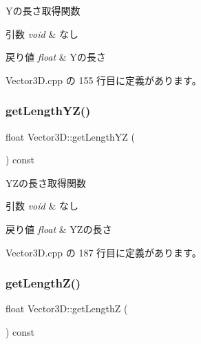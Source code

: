 Yの長さ取得関数 


\begin{DoxyParams}{引数}
{\em void} & なし \\
\hline
\end{DoxyParams}

\begin{DoxyRetVals}{戻り値}
{\em float} & Yの長さ \\
\hline
\end{DoxyRetVals}


 Vector3\+D.\+cpp の 155 行目に定義があります。

\mbox{\label{class_vector3_d_a2fdf90670c71d3efbe0b9f19dabb83eb}} 
\subsubsection{\texorpdfstring{get\+Length\+Y\+Z()}{getLengthYZ()}}
{\footnotesize\ttfamily float Vector3\+D\+::get\+Length\+YZ (\begin{DoxyParamCaption}{ }\end{DoxyParamCaption}) const}



Y\+Zの長さ取得関数 


\begin{DoxyParams}{引数}
{\em void} & なし \\
\hline
\end{DoxyParams}

\begin{DoxyRetVals}{戻り値}
{\em float} & Y\+Zの長さ \\
\hline
\end{DoxyRetVals}


 Vector3\+D.\+cpp の 187 行目に定義があります。

\mbox{\label{class_vector3_d_a534136a09ed7f995ae559687b12f38a1}} 
\subsubsection{\texorpdfstring{get\+Length\+Z()}{getLengthZ()}}
{\footnotesize\ttfamily float Vector3\+D\+::get\+LengthZ (\begin{DoxyParamCaption}{ }\end{DoxyParamCaption}) const}



